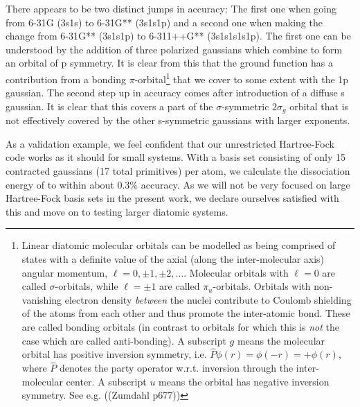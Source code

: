 \documentclass[../../master.tex]{subfiles}
\begin{document}
There appears to be two distinct jumps in accuracy: The first one when going from 6-31G (3s1s) to 6-31G** (3s1s1p) and a second one when making the change from 6-31G** (3s1s1p) to 6-311++G** (3s1s1s1s1p). The first one can be understood by the addition of three polarized gaussians which combine to form an orbital of p symmetry. It is clear from this that the  ground function has a contribution from a bonding $\pi$-orbital\footnote{Linear diatomic molecular orbitals can be modelled as being comprised of states with a definite value of the axial (along the inter-molecular axis) angular momentum, $\ell=0,\pm1,\pm2,\dots$. Molecular orbitals with $\ell=0$ are called $\sigma$-orbitals, while $\ell=\pm1$ are called $\pi_u$-orbitals. Orbitals with non-vanishing electron density \emph{between} the nuclei contribute to Coulomb shielding of the atoms from each other and thus promote the inter-atomic bond. These are called bonding orbitals (in contrast to orbitals for which this is \emph{not} the case which are called anti-bonding). A subscript $g$ means the molecular orbital has positive inversion symmetry, i.e. $\hat P \phi(r)=\phi(-r) = +\phi(r)$, where $\hat P$ denotes the party operator w.r.t. inversion through the inter-molecular center. A subscript $u$ means the orbital has negative inversion symmetry. See e.g. ((Zumdahl p677))} that we cover to some extent with the 1p gaussian. The second step up in accuracy comes after introduction of a diffuse s gaussian. It is clear that this covers a part of the $\sigma$-symmetric $2\sigma_g$ orbital that is not effectively covered by the other s-symmetric gaussians with larger exponents. 

As a validation example, we feel confident that our unrestricted Hartree-Fock code works as it should for small systems. With a basis set consisting of only 15 contracted gaussians (17 total primitives) per atom, we calculate the dissociation energy of  to within about $0.3\%$ accuracy. As we will not be very focused on large Hartree-Fock basis sets in the present work, we declare ourselves satisfied with this and move on to testing larger diatomic systems.
\end{document}
